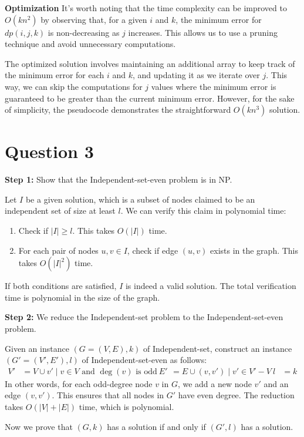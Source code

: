 \documentclass{article}
\begin{document}
\textbf{Optimization}
It's worth noting that the time complexity can be improved to $O(kn^2)$ by observing that, for a given $i$ and $k$, the minimum error for $dp(i, j, k)$ is non-decreasing as $j$ increases. This allows us to use a pruning technique and avoid unnecessary computations.

The optimized solution involves maintaining an additional array to keep track of the minimum error for each $i$ and $k$, and updating it as we iterate over $j$. This way, we can skip the computations for $j$ values where the minimum error is guaranteed to be greater than the current minimum error. However, for the sake of simplicity, the pseudocode demonstrates the straightforward $O(kn^3)$ solution.

\section{Question 3}
\textbf{Step 1:} Show that the Independent-set-even problem is in NP.

Let $I$ be a given solution, which is a subset of nodes claimed to be an independent set of size at least $l$. We can verify this claim in polynomial time:
\begin{enumerate}
\item Check if $|I| \geq l$. This takes $O(|I|)$ time.
\item For each pair of nodes $u,v \in I$, check if edge $(u,v)$ exists in the graph. This takes $O(|I|^2)$ time.
\end{enumerate}
If both conditions are satisfied, $I$ is indeed a valid solution. The total verification time is polynomial in the size of the graph.

\textbf{Step 2:} We reduce the Independent-set problem to the Independent-set-even problem.

Given an instance $(G=(V,E), k)$ of Independent-set, construct an instance $(G'=(V',E'), l)$ of Independent-set-even as follows:
\begin{align*}
V' &= V \cup {v' \mid v \in V \text{ and } \deg(v) \text{ is odd}} \
E' &= E \cup {(v,v') \mid v' \in V' - V} \
l &= k
\end{align*}
In other words, for each odd-degree node $v$ in $G$, we add a new node $v'$ and an edge $(v,v')$. This ensures that all nodes in $G'$ have even degree. The reduction takes $O(|V|+|E|)$ time, which is polynomial.

Now we prove that $(G,k)$ has a solution if and only if $(G',l)$ has a solution.
\end{document}
